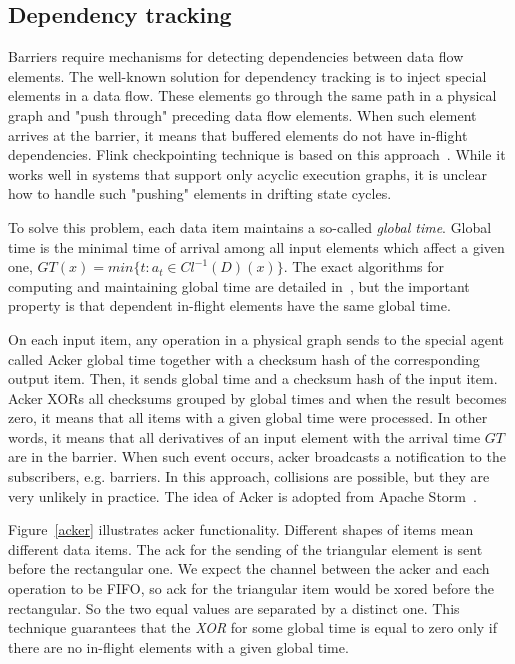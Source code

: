 \subsection{Dependency tracking}

Barriers require mechanisms for detecting dependencies between data flow elements. The well-known solution for dependency tracking is to inject special elements in a data flow. These elements go through the same path in a physical graph and "push through" preceding data flow elements. When such element arrives at the barrier, it means that buffered elements do not have in-flight dependencies. Flink checkpointing technique is based on this approach~\cite{Carbone:2017:SMA:3137765.3137777}. While it works well in systems that support only acyclic execution graphs, it is unclear how to handle such "pushing" elements in drifting state cycles. 

To solve this problem, each data item maintains a so-called {\em global time}. Global time is the minimal time of arrival among all input elements which affect a given one,  $GT(x)=min\{t:a_t\in Cl^{-1}(D)(x)\}$. The exact algorithms for computing and maintaining global time are detailed in~\cite{we2018adbis}, but the important property is that dependent in-flight elements have the same global time. 

On each input item, any operation in a physical graph sends to the special agent called Acker global time together with a checksum hash of the corresponding output item. Then, it sends global time and a checksum hash of the input item. Acker XORs all checksums grouped by global times and when the result becomes zero, it means that all items with a given global time were processed. In other words, it means that all derivatives of an input element with the arrival time $GT$ are in the barrier. When such event occurs, acker broadcasts a notification to the subscribers, e.g. barriers. In this approach, collisions are possible, but they are very unlikely in practice. The idea of Acker is adopted from Apache Storm~\cite{apache:storm}.

Figure~\ref{acker} illustrates acker functionality. Different shapes of items mean different data items. The ack for the sending of the triangular element is sent before the rectangular one. We expect the channel between the acker and each operation to be FIFO, so ack for the triangular item would be xored before the rectangular. So the two equal values are separated by a distinct one. This technique guarantees that the {\it XOR} for some global time is equal to zero only if there are no in-flight elements with a given global time.

